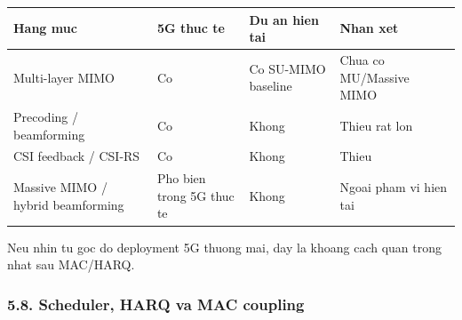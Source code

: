 \documentclass[
  vietnamese,
  a4paper,
  11pt]{article}
\newcounter{none} %
\begin{document}
{\def\LTcaptype{none} %
\begin{longtable}[]{@{}
  >{\raggedright\arraybackslash}p{}
  >{\raggedright\arraybackslash}p{}
  >{\raggedright\arraybackslash}p{}
  >{\raggedright\arraybackslash}p{}@{}}
\toprule\noalign{}
\begin{minipage}[b]{\linewidth}\raggedright
Hang muc
\end{minipage} & \begin{minipage}[b]{\linewidth}\raggedright
5G thuc te
\end{minipage} & \begin{minipage}[b]{\linewidth}\raggedright
Du an hien tai
\end{minipage} & \begin{minipage}[b]{\linewidth}\raggedright
Nhan xet
\end{minipage} \\
\midrule\noalign{}
\endhead
\bottomrule\noalign{}
\endlastfoot
Multi-layer MIMO & Co & Co SU-MIMO baseline & Chua co MU/Massive MIMO \\
Precoding / beamforming & Co & Khong & Thieu rat lon \\
CSI feedback / CSI-RS & Co & Khong & Thieu \\
Massive MIMO / hybrid beamforming & Pho bien trong 5G thuc te & Khong &
Ngoai pham vi hien tai \\
\end{longtable}
}

Neu nhin tu goc do deployment 5G thuong mai, day la khoang cach quan
trong nhat sau MAC/HARQ.

\subsubsection{5.8. Scheduler, HARQ va MAC
coupling}\label{scheduler-harq-va-mac-coupling}
\end{document}
